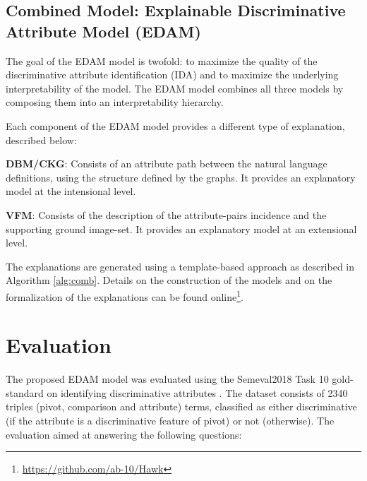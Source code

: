 \documentclass[11pt,a4paper]{article}
\begin{document}
\subsection{Combined Model: Explainable Discriminative Attribute Model (EDAM)}

The goal of the EDAM model is twofold: to maximize the quality of the discriminative attribute identification (IDA) and to maximize the underlying interpretability of the model. The EDAM model combines all three models by composing them into an interpretability hierarchy. 











Each component of the EDAM model provides a different type of explanation, described below:

\noindent \textbf{DBM/CKG}: Consists of an attribute path between the natural language definitions, using the structure defined by the  graphs. It provides an explanatory model at the intensional level.

\noindent \textbf{VFM}: Consists of the description of the attribute-pairs incidence and the supporting ground image-set. It provides an explanatory model at an extensional level.

The explanations are generated using a template-based approach as described in Algorithm \ref{alg:comb}. Details on the construction of the models and on the formalization of the explanations can be found online\footnote{\url{https://github.com/ab-10/Hawk}}. 














\section{Evaluation}
\label{sec:Eval}

The proposed EDAM model was evaluated using the Semeval2018 Task 10 gold-standard on identifying discriminative attributes \cite{semeval2018task10}. The dataset consists of 2340 triples (pivot, comparison and attribute) terms, classified as either discriminative (if the attribute is a discriminative feature of pivot) or not (otherwise). The evaluation aimed at answering the following questions:
\end{document}

